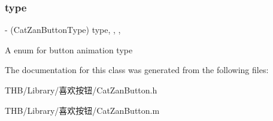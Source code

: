 \subsubsection{\texorpdfstring{type}{type}}
{\footnotesize\ttfamily -\/ (Cat\+Zan\+Button\+Type) type\hspace{0.3cm}{\ttfamily [read]}, {\ttfamily [write]}, {\ttfamily [nonatomic]}, {\ttfamily [assign]}}

A enum for button animation type 

The documentation for this class was generated from the following files\+:\begin{DoxyCompactItemize}
\item 
T\+H\+B/\+Library/喜欢按钮/Cat\+Zan\+Button.\+h\item 
T\+H\+B/\+Library/喜欢按钮/Cat\+Zan\+Button.\+m\end{DoxyCompactItemize}
